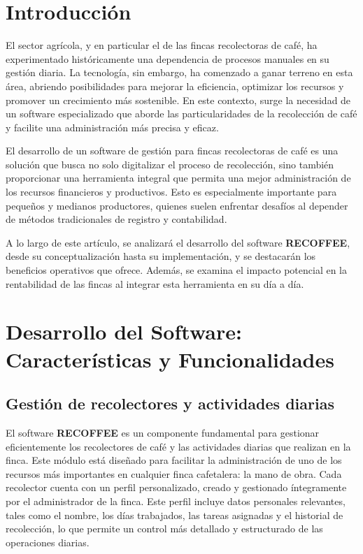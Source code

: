 \documentclass[a4paper,12pt]{article}
\begin{document}
\section{Introducción}

El sector agrícola, y en particular el de las fincas recolectoras de café, ha experimentado históricamente una dependencia de procesos manuales en su gestión diaria. La tecnología, sin embargo, ha comenzado a ganar terreno en esta área, abriendo posibilidades para mejorar la eficiencia, optimizar los recursos y promover un crecimiento más sostenible. En este contexto, surge la necesidad de un software especializado que aborde las particularidades de la recolección de café y facilite una administración más precisa y eficaz.

El desarrollo de un software de gestión para fincas recolectoras de café es una solución que busca no solo digitalizar el proceso de recolección, sino también proporcionar una herramienta integral que permita una mejor administración de los recursos financieros y productivos. Esto es especialmente importante para pequeños y medianos productores, quienes suelen enfrentar desafíos al depender de métodos tradicionales de registro y contabilidad.

A lo largo de este artículo, se analizará el desarrollo del software \textbf{RECOFFEE}, desde su conceptualización hasta su implementación, y se destacarán los beneficios operativos que ofrece. Además, se examina el impacto potencial en la rentabilidad de las fincas al integrar esta herramienta en su día a día.

\section{Desarrollo del Software: Características y Funcionalidades}

\subsection{Gestión de recolectores y actividades diarias}

El software \textbf{RECOFFEE} es un componente fundamental para gestionar eficientemente los recolectores de café y las actividades diarias que realizan en la finca. Este módulo está diseñado para facilitar la administración de uno de los recursos más importantes en cualquier finca cafetalera: la mano de obra. Cada recolector cuenta con un perfil personalizado, creado y gestionado íntegramente por el administrador de la finca. Este perfil incluye datos personales relevantes, tales como el nombre, los días trabajados, las tareas asignadas y el historial de recolección, lo que permite un control más detallado y estructurado de las operaciones diarias.
\end{document}
